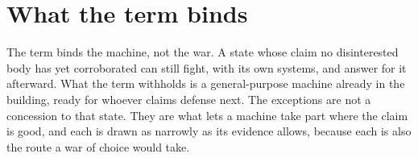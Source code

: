 \section{What the term binds}
\label{sec:5.9}
The term binds the machine, not the war. A state whose claim no disinterested body has yet corroborated can still fight, with its own systems, and answer for it afterward. What the term withholds is a general-purpose machine already in the building, ready for whoever claims defense next. The exceptions are not a concession to that state. They are what lets a machine take part where the claim is good, and each is drawn as narrowly as its evidence allows, because each is also the route a war of choice would take.
